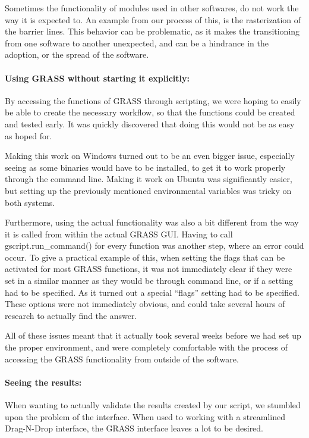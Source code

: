 Sometimes the functionality of modules used in other softwares, do not work the way it is expected to. An example from our process of this, is the rasterization of the barrier lines. This behavior can be problematic, as it makes the transitioning from one software to another unexpected, and can be a hindrance in the adoption, or the spread of the software.

\paragraph{Using GRASS without starting it explicitly:} By accessing the functions of GRASS through scripting, we were hoping to easily be able to create the necessary workflow, so that the functions could be created and tested early. It was quickly discovered that doing this would not be as easy as hoped for. 

Making this work on Windows turned out to be an even bigger issue, especially seeing as some binaries would have to be installed, to get it to work properly through the command line. Making it work on Ubuntu was significantly easier, but setting up the previously mentioned  environmental variables was tricky on both systems. 

Furthermore, using the actual functionality was also a bit different from the way it is called from within the actual GRASS GUI. Having to call gscript.run\_command() for every function was another step, where an error could occur. To give a practical example of this, when setting the flags that can be activated for most GRASS functions, it was not immediately clear if they were set in a similar manner as they would be through command line, or if a setting had to be specified. As it turned out a special “flags” setting had to be specified. These options were not immediately obvious, and could take several hours of research to actually find the answer. 

All of these issues meant that it actually took several weeks before we had set up the proper environment, and were completely comfortable with the process of accessing the GRASS functionality from outside of the software.

\paragraph{Seeing the results:} 
When wanting to actually validate the results created by our script, we stumbled upon the problem of the interface. When used to working with a streamlined Drag-N-Drop interface, the GRASS interface leaves a lot to be desired.

